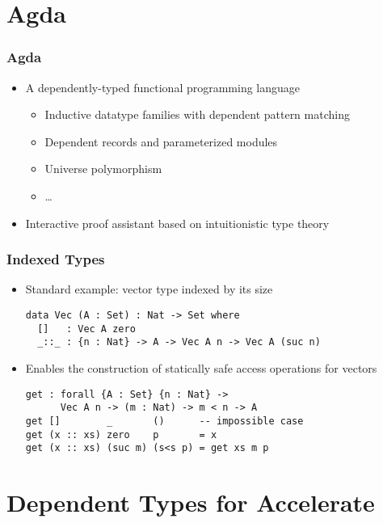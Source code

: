 \documentclass{beamer}
\begin{document}
\section{Agda}
\begin{frame}
  \frametitle{Agda}
  \begin{itemize}
  \item A dependently-typed functional programming language
    \begin{itemize}
    \item Inductive datatype families with dependent pattern matching
    \item Dependent records and parameterized modules
    \item Universe polymorphism
    \item \dots
    \end{itemize}
  \item Interactive proof assistant based on intuitionistic type theory
  \end{itemize}
\end{frame}

\begin{frame}[fragile]
  \frametitle{Indexed Types}
  \begin{itemize}
  \item Standard example: vector type indexed by its size
\begin{verbatim}
data Vec (A : Set) : Nat -> Set where
  []   : Vec A zero
  _::_ : {n : Nat} -> A -> Vec A n -> Vec A (suc n)
\end{verbatim}
  \item Enables the construction of statically safe access operations
    for vectors
\begin{verbatim}
get : forall {A : Set} {n : Nat} ->
      Vec A n -> (m : Nat) -> m < n -> A
get []        _       ()      -- impossible case
get (x :: xs) zero    p       = x
get (x :: xs) (suc m) (s<s p) = get xs m p
\end{verbatim}
  \end{itemize}
\end{frame}

\section{Dependent Types for Accelerate}
\end{document}
